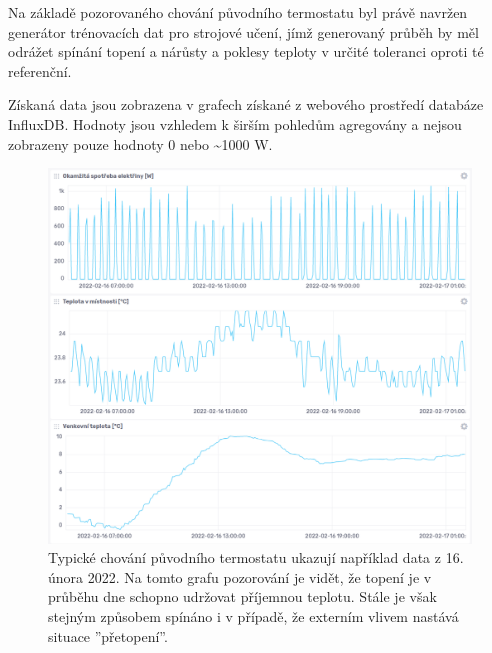 Na základě pozorovaného chování původního termostatu byl právě navržen generátor trénovacích dat pro strojové učení, jímž generovaný průběh by měl odrážet spínání topení a nárůsty a poklesy teploty v určité toleranci oproti té referenční.

Získaná data jsou zobrazena v grafech získané z webového prostředí databáze InfluxDB. Hodnoty jsou vzhledem k širším pohledům agregovány a nejsou zobrazeny pouze hodnoty 0 nebo \textasciitilde1000 W.

\begin{figure}[hbt]
\centering
\includegraphics[width=\textwidth]{obrazky-figures/test-graph-noml.png}
\caption{Typické chování původního termostatu ukazují například data z 16. února 2022. Na tomto grafu pozorování je vidět, že topení je v průběhu dne schopno udržovat příjemnou teplotu. Stále je však stejným způsobem spínáno i v případě, že externím vlivem nastává situace ''přetopení''.}
\end{figure}

